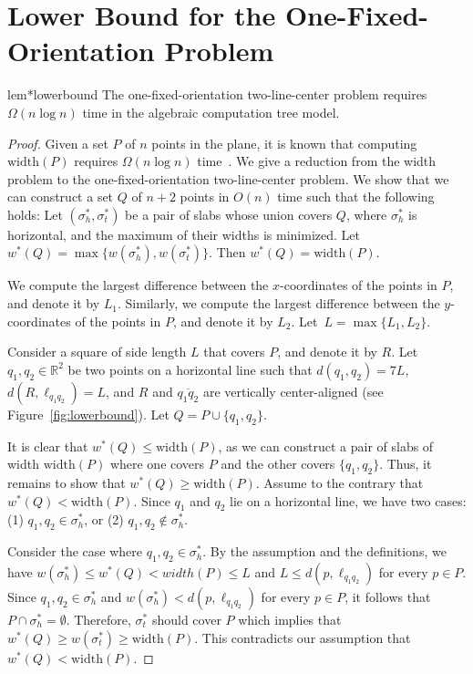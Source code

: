 \documentclass[10pt,a4paper]{article}
\theoremstyle{star}
\theoremstyle{claimstar}
\newcommand{\width}{\ensuremath{\mathrm{width}}}
\begin{document}
\onefixed*



\section{Lower Bound for the One-Fixed-Orientation Problem}
\label{sec:lowerbound}

\begin{restatable}{lem*}{lowerbound}
    The one-fixed-orientation two-line-center problem requires $\Omega (n\log n)$ time in the algebraic computation tree model. 
\end{restatable}


\begin{proof}
    Given a set $P$ of $n$ points in the plane, it is known that computing $\width(P)$ requires $\Omega(n \log n)$ time~\cite{Houle_width, lee1986geometric}.
    We give a reduction from the width problem to the one-fixed-orientation two-line-center problem.
    We show that we can construct a set $Q$ of $n+2$ points in $O(n)$ time such that the following holds:
    Let $(\sigma_h^*, \sigma_t^*)$ be a pair of slabs whose union covers $Q$, where $\sigma_h^*$ is horizontal, and the maximum of their widths is minimized.
    Let $w^*(Q) = \max\{ w(\sigma_h^*), w(\sigma_t^*)\}$.
    Then $w^*(Q) = \width(P)$.


    
    We compute the largest difference between the $x$-coordinates of the points in $P$, and denote it by $L_1$. Similarly, we compute the largest difference between the $y$-coordinates of the points in $P$, and denote it by $L_2$.
    Let~$L = \max\{L_1, L_2\}$.
    
    Consider a square of side length $L$ that covers $P$, and denote it by $R$.
    Let $q_1, q_2 \in \mathbb{R}^2$ be two points on a horizontal line such that $d(q_1, q_2) = 7L$, $d(R, \ell_{q_1q_2}) = L$, and $R$ and $\overline{q_1q_2}$ are vertically center-aligned (see Figure~\ref{fig:lowerbound}).
    Let $Q = P \cup \{q_1, q_2\}$.

    It is clear that $w^*(Q) \le \width(P)$, as we can construct a pair of slabs of width $\width(P)$ where one covers $P$ and the other covers $\{q_1, q_2\}$. 
    Thus, it remains to show that $w^*(Q) \ge \width(P)$. 
    Assume to the contrary that $w^*(Q) < \width(P)$. 
    Since $q_1$ and $q_2$ lie on a horizontal line, we have two cases: 
    (1) $q_1, q_2 \in \sigma_h^*$, or 
    (2) $q_1, q_2 \notin \sigma_h^*$.


    Consider the case where $q_1, q_2 \in \sigma_h^*$.
    By the assumption and the definitions, we have $w(\sigma_h^*) \le w^*(Q) < width (P) \le L$ and 
    $ L \le d(p, \ell_{q_1q_2})$ for every $p\in P$. 
    Since $q_1, q_2 \in \sigma_h^*$ and $w(\sigma_h^*) < d(p, \ell_{q_1q_2})$ for every $p\in P$, 
    it follows that $P\cap \sigma_h^* = \emptyset$.  
    Therefore, $\sigma_t^*$ should cover $P$ which implies that $w^*(Q) \ge w(\sigma_t^*) \ge \width(P)$. This contradicts our assumption that $w^*(Q) < \width(P)$.


\end{proof}
\end{document}
